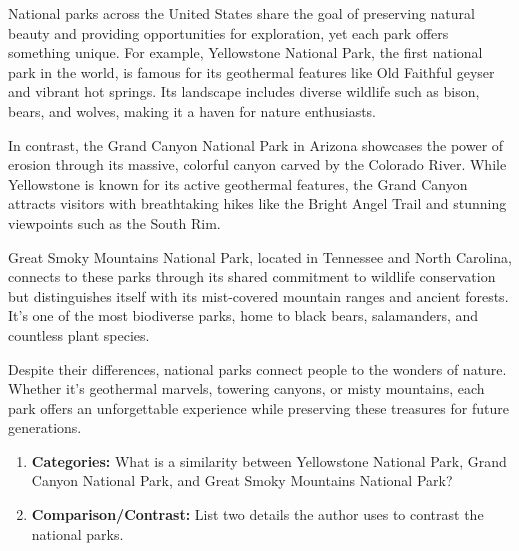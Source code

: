 \documentclass[12pt]{article}
\begin{document}
\begin{tcolorbox}[colframe=black!60, colback=white, 
coltitle=black, colbacktitle=black!15, fonttitle=\bfseries\Large, 
title=Text: The National Parks, halign title=center, left=10pt, right=10pt, top=10pt, bottom=15pt]
National parks across the United States share the goal of preserving natural beauty and providing opportunities for exploration, yet each park offers something unique. For example, Yellowstone National Park, the first national park in the world, is famous for its geothermal features like Old Faithful geyser and vibrant hot springs. Its landscape includes diverse wildlife such as bison, bears, and wolves, making it a haven for nature enthusiasts.

In contrast, the Grand Canyon National Park in Arizona showcases the power of erosion through its massive, colorful canyon carved by the Colorado River. While Yellowstone is known for its active geothermal features, the Grand Canyon attracts visitors with breathtaking hikes like the Bright Angel Trail and stunning viewpoints such as the South Rim.

Great Smoky Mountains National Park, located in Tennessee and North Carolina, connects to these parks through its shared commitment to wildlife conservation but distinguishes itself with its mist-covered mountain ranges and ancient forests. It's one of the most biodiverse parks, home to black bears, salamanders, and countless plant species.

Despite their differences, national parks connect people to the wonders of nature. Whether it’s geothermal marvels, towering canyons, or misty mountains, each park offers an unforgettable experience while preserving these treasures for future generations.

 
\end{tcolorbox}

\vspace{2em}

\begin{tcolorbox}[colframe=black!60, colback=white, 
coltitle=black, colbacktitle=black!15, fonttitle=\bfseries\Large, 
title=Guided Practice, halign title=center, left=10pt, right=10pt, top=10pt, bottom=15pt]

\vspace{0.5cm}

\begin{enumerate}[itemsep=1em]
    \item \textbf{Categories:} What is a similarity between Yellowstone National Park, Grand Canyon National Park, and Great Smoky Mountains National Park? 
\vspace{2cm}
      
    \item \textbf{Comparison/Contrast:} List two details the author uses to contrast the national parks.
\vspace{2cm}
       
\end{enumerate}

\end{tcolorbox}
\end{document}
